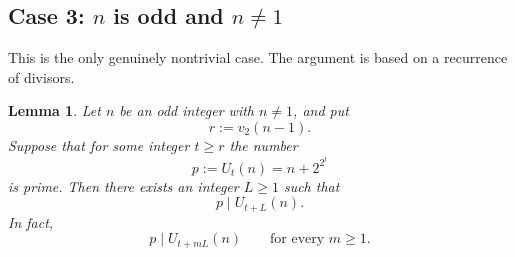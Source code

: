 \documentclass[11pt]{article}
\newtheorem{lemma}[theorem]{Lemma}
\theoremstyle{remark}
\begin{document}
        \subsection*{Case 3: $n$ is odd and $n\ne 1$}

        This is the only genuinely nontrivial case. The argument is based on a recurrence of divisors.

        \begin{lemma}\label{lem:recurrence}
          Let $n$ be an odd integer with $n\ne 1$, and put
          \[
            r:=v_2(n-1).
          \]
          Suppose that for some integer $t\ge r$ the number
          \[
            p:=U_t(n)=n+2^{2^t}
          \]
          is prime. Then there exists an integer $L\ge 1$ such that
          \[
            p\mid U_{t+L}(n).
          \]
          In fact,
          \[
            p\mid U_{t+mL}(n)\qquad\text{for every }m\ge 1.
          \]
        \end{lemma}
\end{document}
